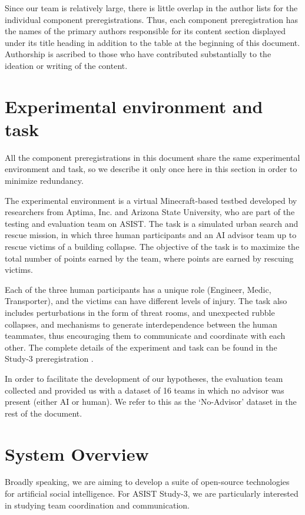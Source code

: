 Since our team is relatively large, there is little overlap in the author lists
for the individual component preregistrations. Thus, each component
preregistration has the names of the primary authors responsible for its
content section displayed under its title heading in addition to the table at
the beginning of this document. Authorship is ascribed to those who have
contributed substantially to the ideation or writing of the content.

\section{Experimental environment and task}

All the component preregistrations in this document share the same experimental
environment and task, so we describe it only once here in this section in order
to minimize redundancy.

The experimental environment is a virtual Minecraft-based testbed developed by
researchers from Aptima, Inc. and Arizona State University, who are part of the
testing and evaluation team on ASIST. 
The task is a simulated urban search and
rescue mission, in which three human participants and an AI advisor team up to
rescue victims of a building collapse. The objective of the task is to maximize
the total number of points earned by the team, where points are earned by
rescuing victims.

Each of the three human participants has a unique role
(Engineer, Medic, Transporter), and the victims can have different levels of
injury.
The task also includes perturbations in the form of threat rooms,
and unexpected rubble collapses, and mechanisms to generate interdependence
between the human teammates, thus encouraging them to communicate and
coordinate with each other.
The complete details of the experiment and task can be found in the Study-3
preregistration \cite{Huang.ea:2022}.

In order to facilitate the development of our hypotheses, the evaluation team
collected and provided us with a dataset of 16 teams in which no advisor was
present (either AI or human). We refer to this as the `No-Advisor' dataset in
the rest of the document.

\section{System Overview}
\label{ch:system}

Broadly speaking, we are aiming to develop a suite of open-source technologies
for artificial social intelligence. For ASIST Study-3, we are particularly
interested in studying team coordination and communication.

